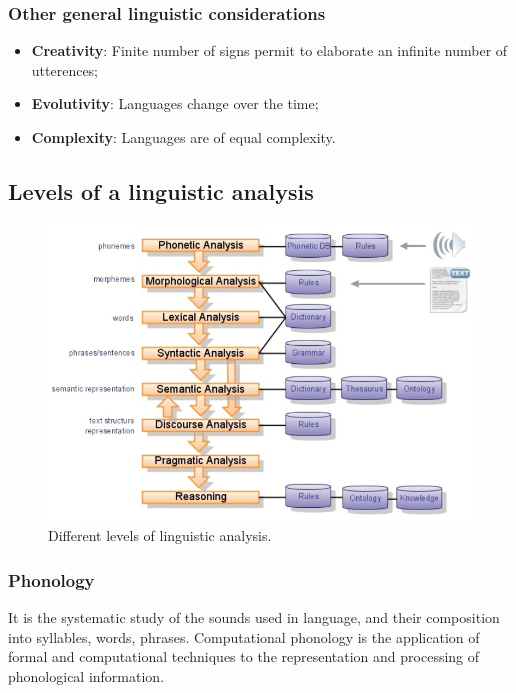 \subsubsection{Other general linguistic considerations}

\begin{itemize}
	\item \textbf{Creativity}: Finite number of signs permit to elaborate an infinite number of utterences;
	\item \textbf{Evolutivity}: Languages change over the time;
	\item \textbf{Complexity}: Languages are of equal complexity.
\end{itemize}

\subsection{Levels of a linguistic analysis}

\begin{figure}[htp]
	\centering
	\includegraphics[scale=0.4]{images/03_levels.png}
 	\caption{Different levels of linguistic analysis.}
\end{figure}

\subsubsection{Phonology}

It is the systematic study of the sounds used in language, and their composition into syllables, words, phrases. Computational phonology is the application of formal and computational techniques to the representation and processing of phonological information.

